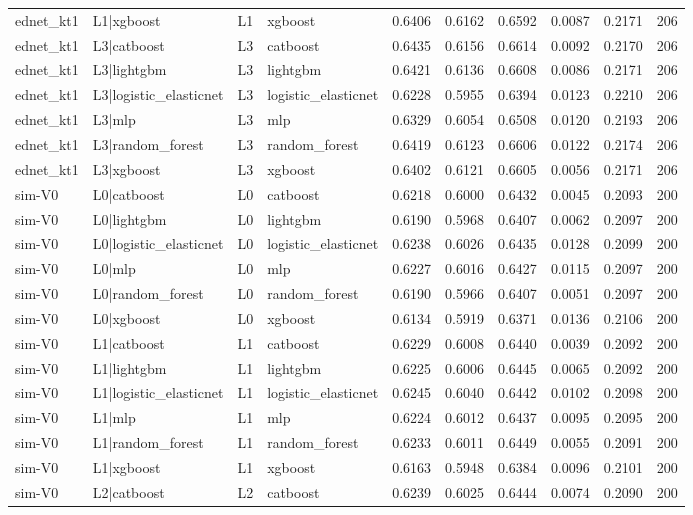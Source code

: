 \begin{table}
\begin{tabular}{llllrrrrrr}
ednet\_kt1 & L1|xgboost & L1 & xgboost & 0.6406 & 0.6162 & 0.6592 & 0.0087 & 0.2171 & 206 \\
ednet\_kt1 & L3|catboost & L3 & catboost & 0.6435 & 0.6156 & 0.6614 & 0.0092 & 0.2170 & 206 \\
ednet\_kt1 & L3|lightgbm & L3 & lightgbm & 0.6421 & 0.6136 & 0.6608 & 0.0086 & 0.2171 & 206 \\
ednet\_kt1 & L3|logistic\_elasticnet & L3 & logistic\_elasticnet & 0.6228 & 0.5955 & 0.6394 & 0.0123 & 0.2210 & 206 \\
ednet\_kt1 & L3|mlp & L3 & mlp & 0.6329 & 0.6054 & 0.6508 & 0.0120 & 0.2193 & 206 \\
ednet\_kt1 & L3|random\_forest & L3 & random\_forest & 0.6419 & 0.6123 & 0.6606 & 0.0122 & 0.2174 & 206 \\
ednet\_kt1 & L3|xgboost & L3 & xgboost & 0.6402 & 0.6121 & 0.6605 & 0.0056 & 0.2171 & 206 \\
sim-V0 & L0|catboost & L0 & catboost & 0.6218 & 0.6000 & 0.6432 & 0.0045 & 0.2093 & 200 \\
sim-V0 & L0|lightgbm & L0 & lightgbm & 0.6190 & 0.5968 & 0.6407 & 0.0062 & 0.2097 & 200 \\
sim-V0 & L0|logistic\_elasticnet & L0 & logistic\_elasticnet & 0.6238 & 0.6026 & 0.6435 & 0.0128 & 0.2099 & 200 \\
sim-V0 & L0|mlp & L0 & mlp & 0.6227 & 0.6016 & 0.6427 & 0.0115 & 0.2097 & 200 \\
sim-V0 & L0|random\_forest & L0 & random\_forest & 0.6190 & 0.5966 & 0.6407 & 0.0051 & 0.2097 & 200 \\
sim-V0 & L0|xgboost & L0 & xgboost & 0.6134 & 0.5919 & 0.6371 & 0.0136 & 0.2106 & 200 \\
sim-V0 & L1|catboost & L1 & catboost & 0.6229 & 0.6008 & 0.6440 & 0.0039 & 0.2092 & 200 \\
sim-V0 & L1|lightgbm & L1 & lightgbm & 0.6225 & 0.6006 & 0.6445 & 0.0065 & 0.2092 & 200 \\
sim-V0 & L1|logistic\_elasticnet & L1 & logistic\_elasticnet & 0.6245 & 0.6040 & 0.6442 & 0.0102 & 0.2098 & 200 \\
sim-V0 & L1|mlp & L1 & mlp & 0.6224 & 0.6012 & 0.6437 & 0.0095 & 0.2095 & 200 \\
sim-V0 & L1|random\_forest & L1 & random\_forest & 0.6233 & 0.6011 & 0.6449 & 0.0055 & 0.2091 & 200 \\
sim-V0 & L1|xgboost & L1 & xgboost & 0.6163 & 0.5948 & 0.6384 & 0.0096 & 0.2101 & 200 \\
sim-V0 & L2|catboost & L2 & catboost & 0.6239 & 0.6025 & 0.6444 & 0.0074 & 0.2090 & 200 \\

\end{tabular}
\end{table}
